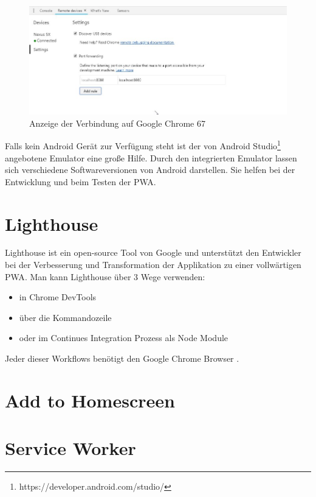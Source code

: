 \begin{figure}[h]
	\centering
	\includegraphics[width=14cm]{BilderAllgemein/DevToolsChrome}\medskip
	\caption{Anzeige der Verbindung auf Google Chrome 67}
	\label{fig:DevToolsChrome}
\end{figure}
\newpage
Falls kein Android Gerät zur Verfügung steht ist der von Android Studio\footnote{https://developer.android.com/studio/} angebotene Emulator eine große Hilfe. Durch den integrierten Emulator lassen sich verschiedene Softwareversionen von Android darstellen. Sie helfen bei der Entwicklung und beim Testen der \acs{PWA}.

\section{Lighthouse}
Lighthouse ist ein open-source Tool von Google und unterstützt den Entwickler bei der Verbesserung und Transformation der Applikation zu einer vollwärtigen \acs{PWA}. Man kann Lighthouse über 3 Wege verwenden:
\begin{itemize}
    \item  in Chrome DevTools
	\item  über die Kommandozeile
	\item  oder im Continues Integration Prozess als Node Module
\end{itemize}
Jeder dieser Workflows benötigt den Google Chrome Browser \cite{Lighthouse}.



\section{Add to Homescreen}


\section{Service Worker}



